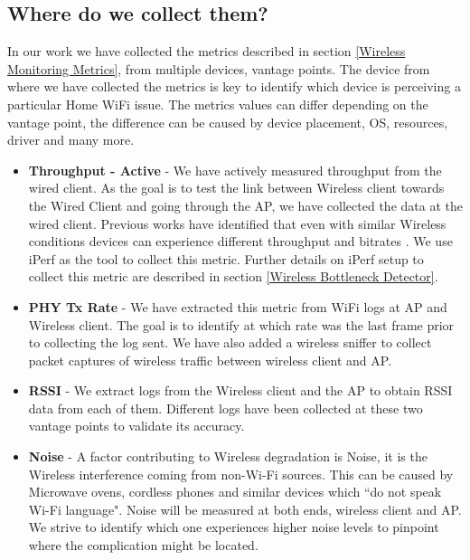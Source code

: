 \subsection{Where do we collect them?}

In our work we have collected the metrics described in section \ref{Wireless Monitoring Metrics}, from multiple devices, vantage points. The device from where we have collected the metrics is key to identify which device is perceiving a particular Home WiFi issue. The metrics values can differ depending on the vantage point, the difference can be caused by device placement, OS, resources, driver and many more.

\begin{itemize}
	\item \textbf{Throughput - Active} - We have actively measured throughput from the wired client. As the goal is to test the link between Wireless client towards the Wired Client and going through the AP, we have collected the data at the wired client. Previous works have identified that even with similar Wireless conditions devices can experience different throughput and bitrates \cite{measuring_user_traffic}. We use iPerf as the tool to collect this metric. Further details on iPerf setup to collect this metric are described in section \ref{Wireless Bottleneck Detector}.
	
	\item \textbf{PHY Tx Rate} - We have extracted this metric from WiFi logs at AP and Wireless client. The goal is to identify at which rate was the last frame prior to collecting the log sent. We have also added a wireless sniffer to collect packet captures of wireless traffic between wireless client and AP.
	
	\item \textbf{RSSI} - We extract logs from the Wireless client and the AP to obtain RSSI data from each of them. Different logs have been collected at these two vantage points to validate its accuracy.
	
	\item \textbf{Noise} - A factor contributing to Wireless degradation is Noise, it is the Wireless interference coming from non-Wi-Fi sources. This can be caused by Microwave ovens, cordless phones and similar devices which ``do not speak Wi-Fi language". Noise will be measured at both ends, wireless client and AP. We strive to identify which one experiences higher noise levels to pinpoint where the complication might be located.
	

\end{itemize}
